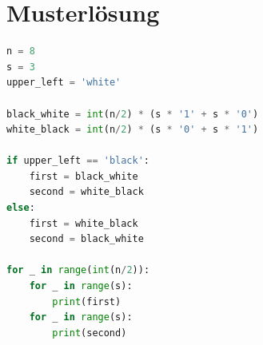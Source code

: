 \clearpage
\section*{Musterlösung}
\begin{lstlisting}[language=Python]
n = 8
s = 3
upper_left = 'white'

black_white = int(n/2) * (s * '1' + s * '0')
white_black = int(n/2) * (s * '0' + s * '1')

if upper_left == 'black':
    first = black_white
    second = white_black
else:
    first = white_black
    second = black_white

for _ in range(int(n/2)):
    for _ in range(s):
        print(first)
    for _ in range(s):
        print(second)
\end{lstlisting}

